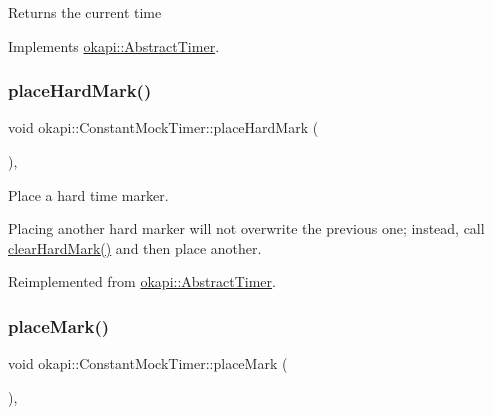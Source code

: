 \begin{DoxyReturn}{Returns}
the current time 
\end{DoxyReturn}


Implements \mbox{\hyperlink{classokapi_1_1AbstractTimer_a6871e119f74d8b6a8c928244e837e762}{okapi\+::\+Abstract\+Timer}}.

\mbox{\label{classokapi_1_1ConstantMockTimer_a048c40fb6fc6f2e44d1e47860e4d5402}} 
\subsubsection{\texorpdfstring{placeHardMark()}{placeHardMark()}}
{\footnotesize\ttfamily void okapi\+::\+Constant\+Mock\+Timer\+::place\+Hard\+Mark (\begin{DoxyParamCaption}{ }\end{DoxyParamCaption})\hspace{0.3cm}{\ttfamily [override]}, {\ttfamily [virtual]}}



Place a hard time marker. 

Placing another hard marker will not overwrite the previous one; instead, call \mbox{\hyperlink{classokapi_1_1ConstantMockTimer_a021608c7b88e41faba5efcd44221fcc9}{clear\+Hard\+Mark()}} and then place another. 

Reimplemented from \mbox{\hyperlink{classokapi_1_1AbstractTimer_a177197191296d0d7a5c49c86d5a514fc}{okapi\+::\+Abstract\+Timer}}.

\mbox{\label{classokapi_1_1ConstantMockTimer_a1d09cc89793c8e35bf788aea68f2bd83}} 
\subsubsection{\texorpdfstring{placeMark()}{placeMark()}}
{\footnotesize\ttfamily void okapi\+::\+Constant\+Mock\+Timer\+::place\+Mark (\begin{DoxyParamCaption}{ }\end{DoxyParamCaption})\hspace{0.3cm}{\ttfamily [override]}, {\ttfamily [virtual]}}



